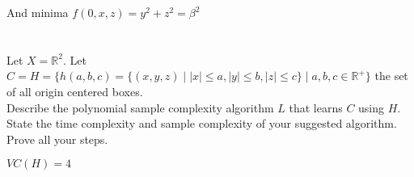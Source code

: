 \documentclass[12pt]{article}
\newcommand\tab[1][1cm]{\hspace*{#1}}
\begin{document}
And minima $f(0,x,z) = y^2 + z^2 = \beta^2 $


\section*{}


\tab Let $X = \mathbb{R}^2$. Let $ C = H =  \lbrace h(a,b,c) = \lbrace(x,y,z) \mid |x| \leq a, |y| \leq b, |z| \leq c \rbrace \mid  a,b,c \in \mathbb{R}^+\rbrace $ the set of all origin centered boxes. \\
\tab Describe the polynomial sample complexity algorithm $L$ that learns $C$ using $H$. State the time complexity and sample complexity of your suggested algorithm. Prove all your steps.


$VC(H) = 4$
\end{document}
